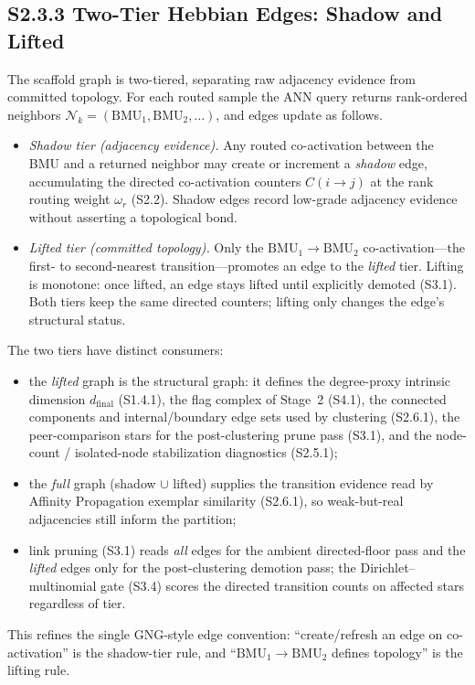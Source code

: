 \documentclass[11pt]{article}
\begin{document}
\subsection*{S2.3.3 Two-Tier Hebbian Edges: Shadow and Lifted}
\label{sec:si-two-tier-edges}
The scaffold graph is two-tiered, separating raw adjacency evidence from committed topology. For each routed sample the ANN query returns rank-ordered neighbors $\mathcal N_k=(\mathrm{BMU}_1,\mathrm{BMU}_2,\dots)$, and edges update as follows.
\begin{itemize}[leftmargin=1.5em]
  \item \emph{Shadow tier (adjacency evidence).} Any routed co-activation between the BMU and a returned neighbor may create or increment a \emph{shadow} edge, accumulating the directed co-activation counters $C(i\!\to\! j)$ at the rank routing weight $\omega_r$ (S2.2). Shadow edges record low-grade adjacency evidence without asserting a topological bond.
  \item \emph{Lifted tier (committed topology).} Only the $\mathrm{BMU}_1\!\to\!\mathrm{BMU}_2$ co-activation---the first- to second-nearest transition---promotes an edge to the \emph{lifted} tier. Lifting is monotone: once lifted, an edge stays lifted until explicitly demoted (S3.1). Both tiers keep the same directed counters; lifting only changes the edge's structural status.
\end{itemize}
The two tiers have distinct consumers:
\begin{itemize}[leftmargin=1.5em]
  \item the \emph{lifted} graph is the structural graph: it defines the degree-proxy intrinsic dimension $d_{\mathrm{final}}$ (S1.4.1), the flag complex of Stage~2 (S4.1), the connected components and internal/boundary edge sets used by clustering (S2.6.1), the peer-comparison stars for the post-clustering prune pass (S3.1), and the node-count / isolated-node stabilization diagnostics (S2.5.1);
  \item the \emph{full} graph (shadow $\cup$ lifted) supplies the transition evidence read by Affinity Propagation exemplar similarity (S2.6.1), so weak-but-real adjacencies still inform the partition;
  \item link pruning (S3.1) reads \emph{all} edges for the ambient directed-floor pass and the \emph{lifted} edges only for the post-clustering demotion pass; the Dirichlet--multinomial gate (S3.4) scores the directed transition counts on affected stars regardless of tier.
\end{itemize}
This refines the single GNG-style edge convention: ``create/refresh an edge on co-activation'' is the shadow-tier rule, and ``$\mathrm{BMU}_1\!\to\!\mathrm{BMU}_2$ defines topology'' is the lifting rule.
\end{document}

